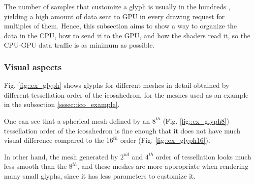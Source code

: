 \documentclass[twoside,twocolumn,10pt]{article}
\begin{document}
The number of samples that customize a glyph is usually in the hundreds \cite{TuchQBall2004, yeh2010}, yielding a high amount of data sent to GPU in every drawing request for multiples of them. Hence, this subsection aims to show a way to organize the data in the CPU, how to send it to the GPU, and how the shaders read it, so the CPU-GPU data traffic is as minimum as possible. 

\subsubsection{Visual aspects}

Fig. \ref{fig::ex_glyph} shows glyphs for different meshes in detail obtained by different tessellation order of the icosahedron, for the meshes used as an example in the subsection \ref{sssec::ico_example}.

One can see that a spherical mesh defined by an $8^{th}$ (Fig. \ref{fig::ex_glyph8}) tessellation order of the icosahedron is fine enough that it does not have much visual difference compared to the $16^{th}$ order (Fig. \ref{fig::ex_glyph16}).

In other hand, the mesh generated by $2^{nd}$ and $4^{th}$ order of tessellation looks much less smooth than the $8^{th}$, and these meshes are more appropriate when rendering many small glyphs, since it has less parameters to customize it.

\end{document}
